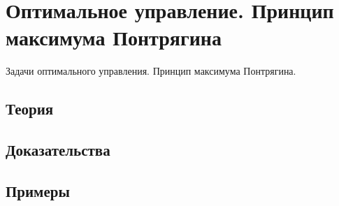 
\section{Оптимальное управление. Принцип максимума Понтрягина}
\label{sec:2.4.10-optimal-control-pontryagin}

\begin{ticket}
Задачи оптимального управления. Принцип максимума Понтрягина.
\end{ticket}

\subsection*{Теория}

\subsection*{Доказательства}

\subsection*{Примеры}
